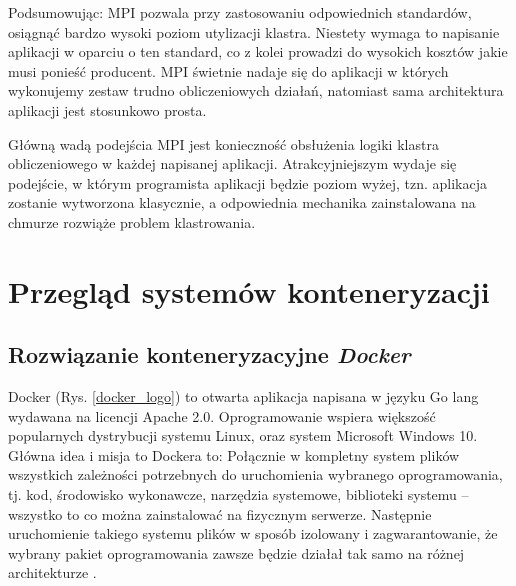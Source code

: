 \documentclass[10pt,a4paper,titlepage,twoside]{report}
\begin{document}
Podsumowując: MPI pozwala przy zastosowaniu odpowiednich standardów, osiągnąć bardzo wysoki poziom utylizacji klastra. Niestety wymaga to napisanie aplikacji w oparciu o ten standard, co z kolei prowadzi do wysokich kosztów jakie musi ponieść producent. MPI świetnie nadaje się do aplikacji w których wykonujemy zestaw trudno obliczeniowych działań, natomiast sama architektura aplikacji jest stosunkowo prosta.

Główną wadą podejścia MPI jest konieczność obsłużenia logiki klastra obliczeniowego w każdej napisanej aplikacji. Atrakcyjniejszym wydaje się podejście, w którym programista aplikacji będzie poziom wyżej, tzn. aplikacja zostanie wytworzona klasycznie, a odpowiednia mechanika zainstalowana na chmurze rozwiąże problem klastrowania.

\section{Przegląd systemów konteneryzacji}
\subsection{Rozwiązanie konteneryzacyjne \textit{Docker}}
\indent \indent Docker (Rys. \ref{docker_logo}) to otwarta aplikacja napisana w języku Go lang wydawana na licencji Apache 2.0. Oprogramowanie wspiera większość popularnych dystrybucji systemu Linux, oraz system Microsoft Windows 10. Główna idea i misja to Dockera to: Połącznie w kompletny system plików wszystkich zależności potrzebnych do uruchomienia wybranego oprogramowania, tj. kod, środowisko wykonawcze, narzędzia systemowe, biblioteki systemu – wszystko to co można zainstalować na fizycznym serwerze. Następnie uruchomienie takiego systemu plików w sposób izolowany i zagwarantowanie, że wybrany pakiet oprogramowania zawsze będzie działał tak samo na różnej architekturze \cite{ad27}.
\end{document}
